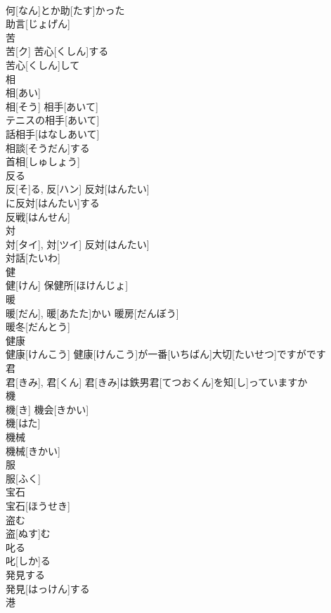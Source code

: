 \documentclass[8pt]{extreport}
\begin{document}
\begin{CJK}{UTF8}{min}
\\	何[なん]とか助[たす]かった 
\\	助言[じょげん] 
\\	苦	
\\	苦[ク]	苦心[くしん]する 
\\	苦心[くしん]して 
\\	相	
\\	相[あい] 
\\	相[そう]	相手[あいて] 
\\	テニスの相手[あいて] 
\\	話相手[はなしあいて] 
\\	相談[そうだん]する 
\\	首相[しゅしょう] 
\\	反る	
\\	反[そ]る, 反[ハン]	反対[はんたい] 
\\	に反対[はんたい]する 
\\	反戦[はんせん] 
\\	対	
\\	対[タイ], 対[ツイ]	反対[はんたい] 
\\	対話[たいわ] 
\\	健	
\\	健[けん]	保健所[ほけんじょ] 
\\	暖	
\\	暖[だん], 暖[あたた]かい	暖房[だんぼう] 
\\	暖冬[だんとう] 
\\	健康	
\\	健康[けんこう]	健康[けんこう]が一番[いちばん]大切[たいせつ]ですがです 
\\	君	
\\	君[きみ], 君[くん]	君[きみ]は鉄男君[てつおくん]を知[し]っていますか 
\\	機	
\\	機[き]	機会[きかい] 
\\	機[はた] 
\\	機械	
\\	機械[きかい]	
\\	服	
\\	服[ふく]	
\\	宝石	
\\	宝石[ほうせき]	
\\	盗む	
\\	盗[ぬす]む	
\\	叱る	
\\	叱[しか]る	
\\	発見する	
\\	発見[はっけん]する	
\\	港	

\end{CJK}
\end{document}
